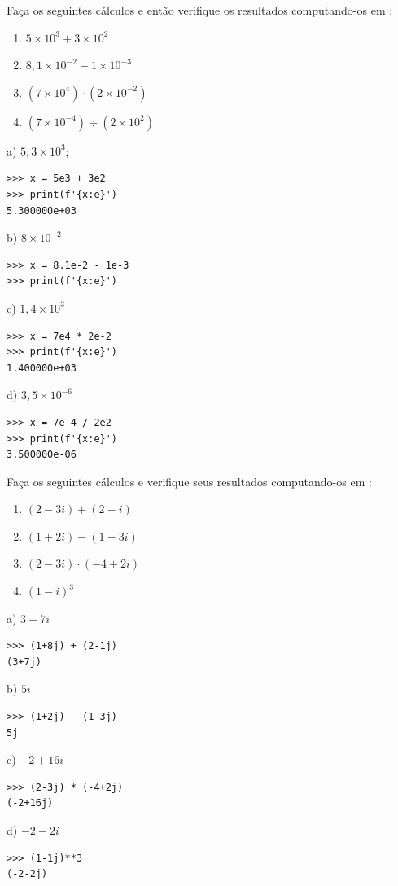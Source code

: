 \begin{exer}
  Faça os seguintes cálculos e então verifique os resultados computando-os em {\python}:
  \begin{enumerate}
  \item $5\times 10^{3} + 3\times 10^{2}$
  \item $8,1\times 10^{-2} - 1\times 10^{-3}$
  \item $\left(7\times 10^4\right)\cdot (2\times 10^{-2})$
  \item $\left(7\times 10^{-4}\right)\div (2\times 10^{2})$
  \end{enumerate}
\end{exer}
\begin{resp}
  a) $5,3\times 10^3$;
\begin{lstlisting}
>>> x = 5e3 + 3e2
>>> print(f'{x:e}')
5.300000e+03
\end{lstlisting}
  
  b) $8\times 10^{-2}$
\begin{lstlisting}
>>> x = 8.1e-2 - 1e-3
>>> print(f'{x:e}')

\end{lstlisting}

  c) $1,4\times 10^{3}$

\begin{lstlisting}
>>> x = 7e4 * 2e-2
>>> print(f'{x:e}')
1.400000e+03
\end{lstlisting}

  d) $3,5\times 10^{-6}$

\begin{lstlisting}
>>> x = 7e-4 / 2e2
>>> print(f'{x:e}')
3.500000e-06
\end{lstlisting}
\end{resp}

\begin{exer}
  Faça os seguintes cálculos e verifique seus resultados computando-os em {\python}:
  \begin{enumerate}
  \item $(2-3i) + (2-i)$
  \item $(1+2i) - (1-3i)$
  \item $(2-3i) \cdot (-4+2i)$
  \item $(1-i)^3$
  \end{enumerate}
\end{exer}
\begin{resp}
  a) $3+7i$
\begin{lstlisting}
>>> (1+8j) + (2-1j)
(3+7j)
\end{lstlisting}

  b) $5i$
\begin{lstlisting}
>>> (1+2j) - (1-3j)
5j
\end{lstlisting}

  c) $-2+16i$

\begin{lstlisting}
>>> (2-3j) * (-4+2j)
(-2+16j)
\end{lstlisting}

  d) $-2-2i$
\begin{lstlisting}
>>> (1-1j)**3
(-2-2j)
\end{lstlisting}
\end{resp}

